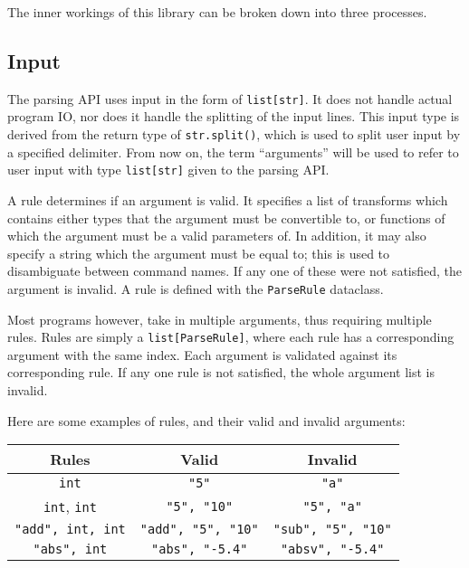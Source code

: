 \documentclass{article}
\begin{document}
		The inner workings of this library can be broken down into three processes.

		\subsection{Input}
			The parsing API uses input in the form of \verb|list[str]|. It does not handle
			actual program IO, nor does it handle the splitting of the input lines. This
			input type is derived from the return type of \verb|str.split()|, which is
			used to split user input by a specified delimiter. From now on, the term
			``arguments'' will be used to refer to user input with type \verb|list[str]|
			given to the parsing API\@.

			A rule determines if an argument is valid. It specifies a list of transforms which
			contains either types that the argument must be convertible to, or functions of
			which the argument must be a valid parameters of. In addition, it may also specify
			a string which the argument must be equal to; this is used to disambiguate between
			command names. If any one of these were not satisfied, the argument is invalid. A
			rule is defined with the \verb|ParseRule| dataclass.

			Most programs however, take in multiple arguments, thus requiring multiple rules.
			Rules are simply a \verb|list[ParseRule]|, where each rule has a corresponding
			argument with the same index. Each argument is validated against its corresponding
			rule. If any one rule is not satisfied, the whole argument list is invalid.

			Here are some examples of rules, and their valid and invalid arguments:

			\begin{center}
				\begin{tabular}{|c|c|c|}
					\hline
					Rules & Valid & Invalid
					\\ \hline
						\verb|int| &
						\verb|"5"| &
						\verb|"a"|
					\\ \hline
						\verb|int|, \verb|int| &
						\verb|"5", "10"| &
						\verb|"5", "a"|
					\\ \hline
						\verb|"add", int, int| &
						\verb|"add", "5", "10"| &
						\verb|"sub", "5", "10"|
					\\ \hline
						\verb|"abs", int| &
						\verb|"abs", "-5.4"| &
						\verb|"absv", "-5.4"|
					\\\hline
				\end{tabular}
			\end{center}
\end{document}
